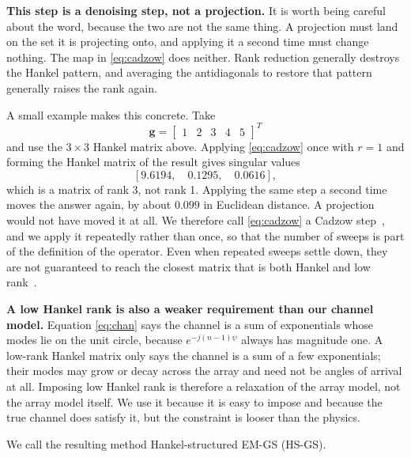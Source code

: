\documentclass[journal]{IEEEtran}
\newcommand{\bg}{\mathbf{g}}
\begin{document}
\textbf{This step is a denoising step, not a projection.} It is worth being
careful about the word, because the two are not the same thing. A projection
must land on the set it is projecting onto, and applying it a second time must
change nothing. The map in \eqref{eq:cadzow} does neither. Rank reduction
generally destroys the Hankel pattern, and averaging the antidiagonals to
restore that pattern generally raises the rank again.

A small example makes this concrete. Take
\begin{equation}
\bg=\begin{bmatrix}1&2&3&4&5\end{bmatrix}^T
\end{equation}
and use the $3\times3$ Hankel matrix above. Applying \eqref{eq:cadzow} once
with $r=1$ and forming the Hankel matrix of the result gives singular values
\begin{equation}
\left[9.6194,\quad 0.1295,\quad 0.0616\right],
\end{equation}
which is a matrix of rank 3, not rank 1. Applying the same step a second time
moves the answer again, by about $0.099$ in Euclidean distance. A projection
would not have moved it at all. We therefore call \eqref{eq:cadzow} a Cadzow
step~\cite{cadzow1988}, and we apply it repeatedly rather than once, so that
the number of sweeps is part of the definition of the operator. Even when
repeated sweeps settle down, they are not guaranteed to reach the closest
matrix that is both Hankel and low rank~\cite{markovsky2008}.

\textbf{A low Hankel rank is also a weaker requirement than our channel
model.} Equation \eqref{eq:chan} says the channel is a sum of exponentials
whose modes lie on the unit circle, because $e^{-j(n-1)\psi}$ always has
magnitude one. A low-rank Hankel matrix only says the channel is a sum of a few
exponentials; their modes may grow or decay across the array and need not be
angles of arrival at all. Imposing low Hankel rank is therefore a relaxation of
the array model, not the array model itself. We use it because it is easy to
impose and because the true channel does satisfy it, but the constraint is
looser than the physics.

We call the resulting method Hankel-structured EM-GS (HS-GS).
\end{document}
